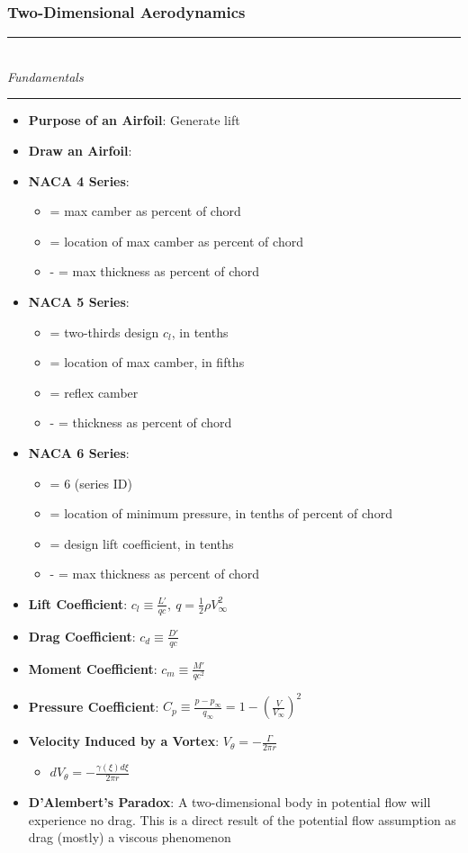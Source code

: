 \documentclass[11pt]{article}
\newcommand{\Item}[1]{\item \textbf{#1}:}
\newcommand{\Header}[1]{\noindent\rule{\textwidth}{0.4pt}\\[0.3cm]\indent \large{\textit{#1}}\normalsize{}\\[-0.1cm]\noindent\rule{\textwidth}{0.4pt}}
\newcommand{\Vinfty}{V_\infty}
\newcommand{\qinfty}{q_\infty}
\begin{document}
\subsubsection{Two-Dimensional Aerodynamics}
\Header{Fundamentals}
\begin{itemize}
\Item{Purpose of an Airfoil} Generate lift
\Item{Draw an Airfoil}
\Item{NACA 4 Series} 
	\begin{itemize}
	\item {} = max camber as percent of chord
	\item {} = location of max camber as percent of chord
	\item {}- = max thickness as percent of chord
	\end{itemize}
\Item{NACA 5 Series}
	\begin{itemize}
	\item {} = two-thirds design $c_l$, in tenths
	\item {} = location of max camber, in fifths
	\item {} = reflex camber
	\item {}- = thickness as percent of chord
	\end{itemize}
\Item{NACA 6 Series}
	\begin{itemize}
	\item {} = 6 (series ID)
	\item {} = location of minimum pressure, in tenths of percent of chord
	\item {} = design lift coefficient, in tenths
	\item {}- = max thickness as percent of chord
	\end{itemize}
\Item{Lift Coefficient} $c_l \equiv \frac{L'}{qc},\ q = \frac{1}{2}\rho \Vinfty^2$
\Item{Drag Coefficient} $c_d \equiv \frac{D'}{qc}$
\Item{Moment Coefficient} $c_m \equiv \frac{M'}{qc^2}$
\Item{Pressure Coefficient} $C_p \equiv \frac{p-p_\infty}{\qinfty} = 1-\left(\frac{V}{\Vinfty}\right)^2$
\Item{Velocity Induced by a Vortex} $V_\theta = -\frac{\Gamma}{2\pi r}$
	\begin{itemize}
	\item $dV_\theta = -\frac{\gamma(\xi)d\xi}{2\pi r}$
	\end{itemize}
\Item{D'Alembert's Paradox} A two-dimensional body in potential flow will experience no drag. This is a direct result of the potential flow assumption as drag (mostly) a viscous phenomenon
\end{itemize}
\end{document}
